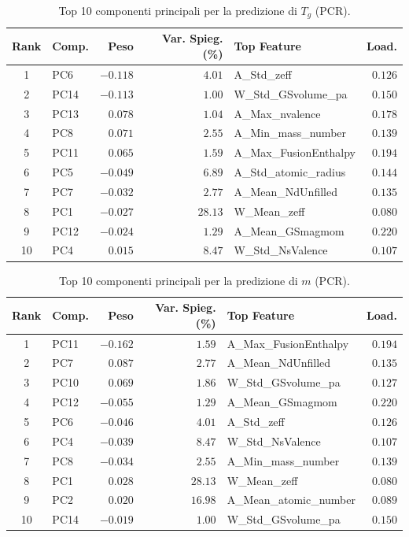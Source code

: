 \documentclass[../main.tex]{subfiles}
\begin{document}
	\begin{table}[htbp]
		\centering
		\begin{tabular}{cl r r l r}
			\toprule
			\textbf{Rank} & \textbf{Comp.} & \textbf{Peso} & \textbf{Var. Spieg. (\%)} & \textbf{Top Feature} & \textbf{Load.} \\
			\midrule
			1 & PC6 & $-0.118$ & $4.01$ & A\_Std\_zeff & $0.126$ \\
			2 & PC14 & $-0.113$ & $1.00$ & W\_Std\_GSvolume\_pa & $0.150$ \\
			3 & PC13 & $0.078$ & $1.04$ & A\_Max\_nvalence & $0.178$ \\
			4 & PC8 & $0.071$ & $2.55$ & A\_Min\_mass\_number & $0.139$ \\
			5 & PC11 & $0.065$ & $1.59$ & A\_Max\_FusionEnthalpy & $0.194$ \\
			6 & PC5 & $-0.049$ & $6.89$ & A\_Std\_atomic\_radius & $0.144$ \\
			7 & PC7 & $-0.032$ & $2.77$ & A\_Mean\_NdUnfilled & $0.135$ \\
			8 & PC1 & $-0.027$ & $28.13$ & W\_Mean\_zeff & $0.080$ \\
			9 & PC12 & $-0.024$ & $1.29$ & A\_Mean\_GSmagmom & $0.220$ \\
			10 & PC4 & $0.015$ & $8.47$ & W\_Std\_NsValence & $0.107$ \\
			\bottomrule
		\end{tabular}
		\caption{Top 10 componenti principali per la predizione di $T_g$ (PCR).}
	\end{table}
	
	\begin{table}[htbp]
		\centering
		\begin{tabular}{cl r r l r}
			\toprule
			\textbf{Rank} & \textbf{Comp.} & \textbf{Peso} & \textbf{Var. Spieg. (\%)} & \textbf{Top Feature} & \textbf{Load.} \\
			\midrule
			1 & PC11 & $-0.162$ & $1.59$ & A\_Max\_FusionEnthalpy & $0.194$ \\
			2 & PC7 & $0.087$ & $2.77$ & A\_Mean\_NdUnfilled & $0.135$ \\
			3 & PC10 & $0.069$ & $1.86$ & W\_Std\_GSvolume\_pa & $0.127$ \\
			4 & PC12 & $-0.055$ & $1.29$ & A\_Mean\_GSmagmom & $0.220$ \\
			5 & PC6 & $-0.046$ & $4.01$ & A\_Std\_zeff & $0.126$ \\
			6 & PC4 & $-0.039$ & $8.47$ & W\_Std\_NsValence & $0.107$ \\
			7 & PC8 & $-0.034$ & $2.55$ & A\_Min\_mass\_number & $0.139$ \\
			8 & PC1 & $0.028$ & $28.13$ & W\_Mean\_zeff & $0.080$ \\
			9 & PC2 & $0.020$ & $16.98$ & A\_Mean\_atomic\_number & $0.089$ \\
			10 & PC14 & $-0.019$ & $1.00$ & W\_Std\_GSvolume\_pa & $0.150$ \\
			\bottomrule
		\end{tabular}
		\caption{Top 10 componenti principali per la predizione di $m$ (PCR).}
	\end{table}
	
\end{document}
